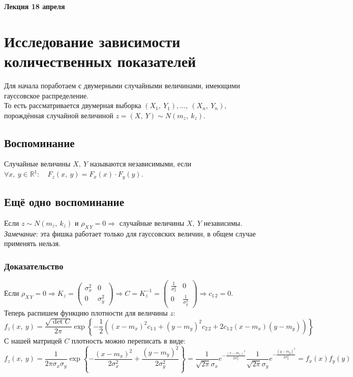 \documentclass[12pt, a4paper]{article}
\newcommand{\real}{\mathbb{R}}
\begin{document}
\newpage
\begin{center}
    \bf Лекция 18 апреля
\end{center}
\section*{Исследование зависимости количественных показателей}
Для начала поработаем с двумерными случайными величинами, имеющими гауссовское распределение.\\
То есть рассматривается двумерная выборка $(X_1,\ Y_1),\dots,\ (X_n,\ Y_n)$, порождённая случайной величиной $z = (X,\ Y) \sim N(m_z,\ k_z)$.
\subsection*{Воспоминание}
Случайные величины $X,\ Y$ называются независимыми, если $\forall x,\ y \in \real^1:\quad F_z (x,\ y) = F_x(x)\cdot F_y(y)$.
\subsection*{Ещё одно воспоминание}
Если $z \sim N(m_z,\ k_z)$ и $\rho_{X\, Y} = 0 \Rightarrow$ случайные величины $X,\ Y$ независимы.\\
\textit{Замечание}: эта фишка работает только для гауссовских величин, в общем случае применять нельзя.
\subsubsection*{Доказательство}
Если $\rho_{X\, Y} = 0 \Rightarrow K_z = \begin{pmatrix}
    \sigma_x^2 & 0\\
    0 & \sigma_y^2
\end{pmatrix} \Rightarrow C = K_{z}^{-1} = \begin{pmatrix}
    \frac{1}{\sigma_x^2} & 0\\
    0 & \frac{1}{\sigma_y^2}
\end{pmatrix} \Rightarrow c_{1\, 2} = 0$.\\
Теперь распишем функцию плотности для величины $z$:
\[f_z(x,\ y) = \frac{\sqrt{\det C}}{ 2\pi} \exp \left\{ -\frac{1}{2} \left( {\left( x - m_x \right)}^2 c_{1\, 1} + {\left( y - m_y \right)}^2 c_{2\, 2} + 2c_{1\, 2} (x - m_x)(y - m_y) \right) \right\}\]
С нашей матрицей $C$ плотность можно переписать в виде:
\[f_z(x,\ y) = \frac{1}{2\pi \sigma_x \sigma_y} \exp \left\{ -\frac{{(x - m_x)}^2}{2\sigma_x^2} + \frac{ {\left( y - m_y \right)}^2 }{2\sigma_y^2} \right\} = \frac{1}{\sqrt{2\pi} \sigma_x} e^{-\frac{ {\left( x - m_x \right)}^2 }{2\sigma^2_x}} \frac{1}{\sqrt{2\pi} \sigma_y} e^{ -\frac{ {\left( y - m_y \right)}^2 }{2\sigma^2_y} } = f_x(x) f_y(y)\]
\end{document}
